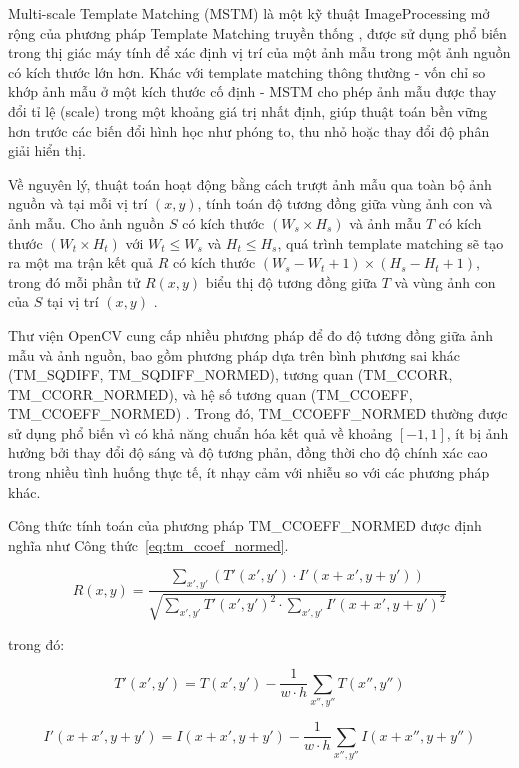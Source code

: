 \documentclass[a4paper, 12pt]{report}
\begin{document}
Multi-scale Template Matching (MSTM) \cite{pyimagesearch_mstm} là một kỹ thuật \gls{ImageProcessing} mở rộng của phương pháp Template Matching truyền thống \cite{opencvTemplateMatching}, được sử dụng phổ biến trong thị giác máy tính để xác định vị trí của một ảnh mẫu trong một ảnh nguồn có kích thước lớn hơn. Khác với template matching thông thường - vốn chỉ so khớp ảnh mẫu ở một kích thước cố định - MSTM cho phép ảnh mẫu được thay đổi tỉ lệ (scale) trong một khoảng giá trị nhất định, giúp thuật toán bền vững hơn trước các biến đổi hình học như phóng to, thu nhỏ hoặc thay đổi độ phân giải hiển thị.

Về nguyên lý, thuật toán hoạt động bằng cách trượt ảnh mẫu qua toàn bộ ảnh nguồn và tại mỗi vị trí $(x, y)$, tính toán độ tương đồng giữa vùng ảnh con và ảnh mẫu. Cho ảnh nguồn $S$ có kích thước $(W_s \times H_s)$ và ảnh mẫu $T$ có kích thước $(W_t \times H_t)$ với $W_t \le W_s$ và $H_t \le H_s$, quá trình template matching sẽ tạo ra một ma trận kết quả $R$ có kích thước $(W_s - W_t + 1) \times (H_s - H_t + 1)$, trong đó mỗi phần tử $R(x, y)$ biểu thị độ tương đồng giữa $T$ và vùng ảnh con của $S$ tại vị trí $(x, y)$ \cite{opencv_object_detection}.  

Thư viện OpenCV cung cấp nhiều phương pháp để đo độ tương đồng giữa ảnh mẫu và ảnh nguồn, bao gồm phương pháp dựa trên bình phương sai khác (TM\_SQDIFF, TM\_SQDIFF\_NORMED), tương quan (TM\_CCORR, TM\_CCORR\_NORMED), và hệ số tương quan (TM\_CCOEFF, TM\_CCOEFF\_NORMED) \cite{opencv_measure}. Trong đó, TM\_CCOEFF\_NORMED thường được sử dụng phổ biến vì có khả năng chuẩn hóa kết quả về khoảng $[-1, 1]$, ít bị ảnh hưởng bởi thay đổi độ sáng và độ tương phản, đồng thời cho độ chính xác cao trong nhiều tình huống thực tế, ít nhạy cảm với nhiễu so với các phương pháp khác.

Công thức tính toán của phương pháp TM\_CCOEFF\_NORMED được định nghĩa như Công thức~\ref{eq:tm_ccoef_normed}.

\begin{equation}
R(x, y) = \frac{\sum_{x',y'} (T'(x',y') \cdot I'(x+x', y+y'))}{\sqrt{\sum_{x',y'} T'(x',y')^2 \cdot \sum_{x',y'} I'(x+x', y+y')^2}}
\label{eq:tm_ccoef_normed}
\end{equation}

trong đó:

\begin{equation}
T'(x',y') = T(x',y') - \frac{1}{w \cdot h} \sum_{x'',y''} T(x'',y'')
\end{equation}

\begin{equation}
I'(x+x', y+y') = I(x+x', y+y') - \frac{1}{w \cdot h} \sum_{x'',y''} I(x+x'', y+y'')
\end{equation}
\end{document}
